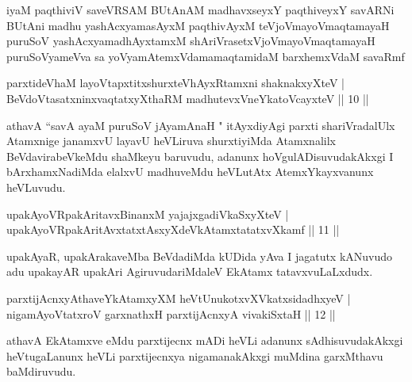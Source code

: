 \centerline{}

\begin{shl}
iyaM paqthiviV saveVRSAM BUtAnAM madhavxseyxY paqthiveyxY savARNi BUtAni madhu yashAcxyamasAyxM paqthivAyxM teVjoVmayoV\s maqtamayaH puruSoV yashAcxyamadhAyxtamxM shAriVrasetxVjoVmayoV\s maqtamayaH puruSoV\s yameVva sa yoV\s yamAtemxVdamamaqtamidaM barxhemxVdaM savaRmf 
\end{shl}



\begin{shl}
parxtideVhaM layoVtapxtitxshurxteVhAyxRtamxni shaknakxyXteV |\\
BeVdoV\s tasatxninxvaqtatxyXthaRM madhutevxVneYkatoVcayxteV \hfill || 10 ||
\end{shl}

\begin{artha}
athavA ``savA ayaM puruSoV jAyamAnaH " itAyxdiyAgi parxti shariVradalUlx Atamxnige janamxvU layavU heVLiruva shurxtiyiMda Atamxnalilx BeVdavirabeVkeMdu shaMkeyu baruvudu, adanunx hoVgulADisuvudakAkxgi I bArxhamxNadiMda elalxvU madhuveMdu heVLutAtx AtemxYkayxvanunx heVLuvudu.
\end{artha}


\begin{shl}
upakAyoVRpakAritavxBinanxM yajajxgadiVkaSxyXteV |\\
upakAyoVRpakAritAvxtatxtAsxyXdeVkAtamxtatatxvXkamf \hfill || 11 ||
\end{shl}

\begin{artha}
upakAyaR, upakArakaveMba BeVdadiMda kUDida yAva I jagatutx kANuvudo adu upakayAR upakAri AgiruvudariMdaleV EkAtamx tatavxvuLaLxdudx.
\end{artha}


\begin{shl}
parxtijAcnxyAthaveYkAtamxyXM heVtUnukotxvXVkatxsidadhxyeV |\\
nigamAyoVtatxroV garxnathxH parxtijAcnxyA vivakiSxtaH \hfill || 12 ||
\end{shl}

\begin{artha}
athavA EkAtamxve eMdu parxtijecnx mADi heVLi adanunx sAdhisuvudakAkxgi heVtugaLanunx heVLi parxtijecnxya nigamanakAkxgi muMdina garxMthavu baMdiruvudu.
\end{artha}

